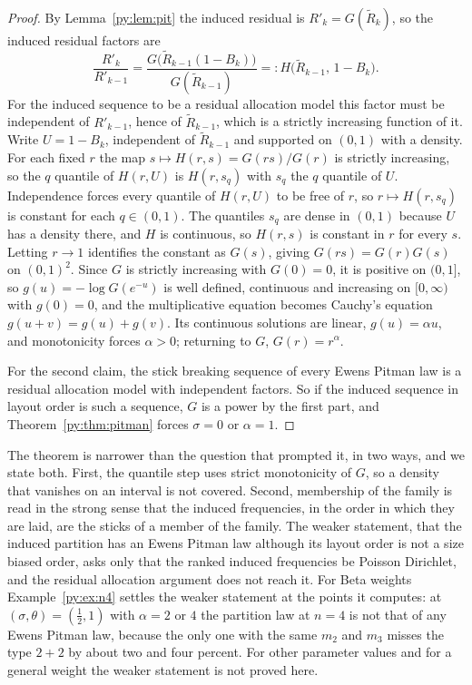 \begin{proof}
By Lemma~\ref{py:lem:pit} the induced residual is $R'_k = G(\widetilde R_k)$, so the induced residual
factors are
\[
\frac{R'_k}{R'_{k-1}}
= \frac{G\big(\widetilde R_{k-1}(1-B_k)\big)}{G(\widetilde R_{k-1})}
=: H\big(\widetilde R_{k-1},\, 1-B_k\big).
\]
For the induced sequence to be a residual allocation model this factor must be independent of
$R'_{k-1}$, hence of $\widetilde R_{k-1}$, which is a strictly increasing function of it. Write
$U = 1-B_k$, independent of $\widetilde R_{k-1}$ and supported on $(0,1)$ with a density. For each
fixed $r$ the map $s \mapsto H(r,s) = G(rs)/G(r)$ is strictly increasing, so the $q$ quantile of
$H(r,U)$ is $H(r, s_q)$ with $s_q$ the $q$ quantile of $U$. Independence forces every quantile of
$H(r,U)$ to be free of $r$, so $r \mapsto H(r,s_q)$ is constant for each $q \in (0,1)$. The
quantiles $s_q$ are dense in $(0,1)$ because $U$ has a density there, and $H$ is continuous, so
$H(r,s)$ is constant in $r$ for every $s$. Letting $r \to 1$ identifies the constant as $G(s)$,
giving $G(rs) = G(r)G(s)$ on $(0,1)^2$. Since $G$ is strictly increasing with $G(0) = 0$, it is
positive on $(0,1]$, so $g(u) = -\log G(e^{-u})$ is well defined, continuous and increasing on
$[0,\infty)$ with $g(0) = 0$, and the multiplicative equation becomes Cauchy's equation
$g(u+v) = g(u)+g(v)$. Its continuous solutions are linear, $g(u) = \alpha u$, and monotonicity
forces $\alpha > 0$; returning to $G$, $G(r) = r^{\alpha}$.

For the second claim, the stick breaking sequence of every Ewens Pitman law is a residual allocation model with independent
factors. So if the induced sequence in layout order is such a sequence, $G$ is a power by the first part,
and Theorem~\ref{py:thm:pitman} forces $\sigma = 0$ or $\alpha = 1$.
\end{proof}

The theorem is narrower than the question that prompted it, in two ways, and we state both. First, the quantile step uses strict monotonicity of $G$, so a density that vanishes on an interval is not covered. Second, membership of the family is read in the strong sense that the induced frequencies, in the order in which they are laid, are the sticks of a member of the family. The weaker statement, that the induced partition has an Ewens Pitman law although its layout order is not a size biased order, asks only that the ranked induced frequencies be Poisson Dirichlet, and the residual allocation argument does not reach it. For Beta weights Example~\ref{py:ex:n4} settles the weaker statement at the points it computes: at $(\sigma,\theta) = (\tfrac12,1)$ with $\alpha = 2$ or $4$ the partition law at $n = 4$ is not that of any Ewens Pitman law, because the only one with the same $m_2$ and $m_3$ misses the type $2{+}2$ by about two and four percent. For other parameter values and for a general weight the weaker statement is not proved here.

